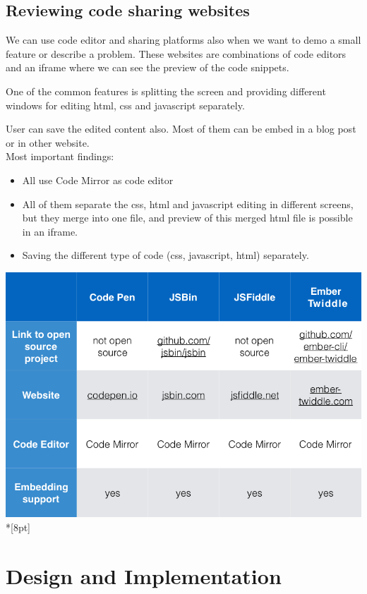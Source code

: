 \documentclass[12pt, a4paper, oneside, openright, medskipamount]{report}
\begin{document}
\section{Reviewing code sharing websites}

We can use code editor and sharing platforms also when we want to demo a small feature or describe a problem. These websites are combinations of code editors and an iframe where we can see the preview of the code snippets.

One of the common features is splitting the screen and providing different windows for editing html, css and javascript separately.

User can save the edited content also. Most of them can be embed in a blog post or in other website. \\

\noindent Most important findings:
\begin{itemize}[noitemsep]
\item All use Code Mirror as code editor
\item All of them separate the css, html and javascript editing in different screens, but they merge into one file, and preview of this merged html file is possible in an iframe.
\item Saving the different type of code (css, javascript, html) separately.
\end{itemize}

\newpage

\includegraphics[width=1\textwidth]{assets/code-sharing-website-review}\\*[8pt]

\chapter{Design and Implementation}
\end{document}
